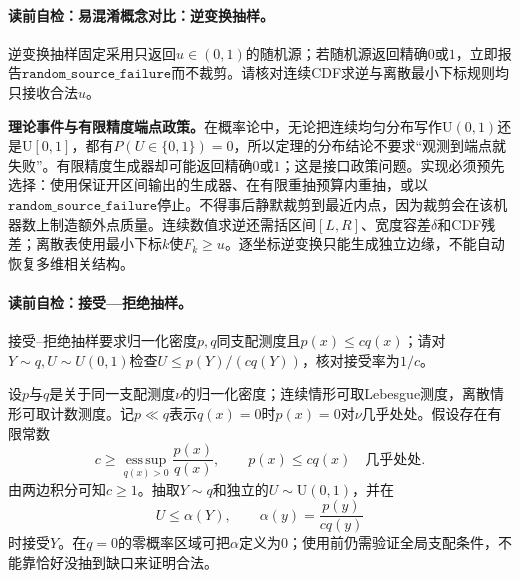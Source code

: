 \paragraph{读前自检：易混淆概念对比：逆变换抽样。}逆变换抽样固定采用只返回$u\in(0,1)$的随机源；若随机源返回精确$0$或$1$，立即报告$\mathtt{random\_source\_failure}$而不裁剪。请核对连续CDF求逆与离散最小下标规则均只接收合法$u$。\par

\begin{comparisonbox}
\textbf{理论事件与有限精度端点政策。}在概率论中，无论把连续均匀分布写作$\mathrm U(0,1)$还是$\mathrm U[0,1]$，都有$P(U\in\{0,1\})=0$，所以定理的分布结论不要求“观测到端点就失败”。有限精度生成器却可能返回精确$0$或$1$；这是接口政策问题。实现必须预先选择：使用保证开区间输出的生成器、在有限重抽预算内重抽，或以$\mathtt{random\_source\_failure}$停止。不得事后静默裁剪到最近内点，因为裁剪会在该机器数上制造额外点质量。连续数值求逆还需括区间$[L,R]$、宽度容差$\delta$和CDF残差；离散表使用最小下标$k$使$F_k\ge u$。逐坐标逆变换只能生成独立边缘，不能自动恢复多维相关结构。
\end{comparisonbox}

\paragraph{读前自检：接受—拒绝抽样。}接受--拒绝抽样要求归一化密度$p,q$同支配测度且$p(x)\le c q(x)$；请对$Y\sim q,U\sim U(0,1)$检查$U\le p(Y)/(cq(Y))$，核对接受率为$1/c$。\par

设$p$与$q$是关于同一支配测度$\nu$的归一化密度；连续情形可取Lebesgue测度，离散情形可取计数测度。记$p\ll q$表示$q(x)=0$时$p(x)=0$对$\nu$几乎处处。假设存在有限常数
\begin{equation}\label{eq:V5-C02-envelope}
c\ge\operatorname*{ess\,sup}_{q(x)>0}\frac{p(x)}{q(x)},
\qquad p(x)\le c q(x)\quad\text{几乎处处}.
\end{equation}
由两边积分可知$c\ge1$。抽取$Y\sim q$和独立的$U\sim\mathrm U(0,1)$，并在
\begin{equation}\label{eq:V5-C02-accept-event}
U\le\alpha(Y),\qquad \alpha(y)=\frac{p(y)}{c q(y)}
\end{equation}
时接受$Y$。在$q=0$的零概率区域可把$\alpha$定义为$0$；使用前仍需验证全局支配条件，不能靠恰好没抽到缺口来证明合法。

